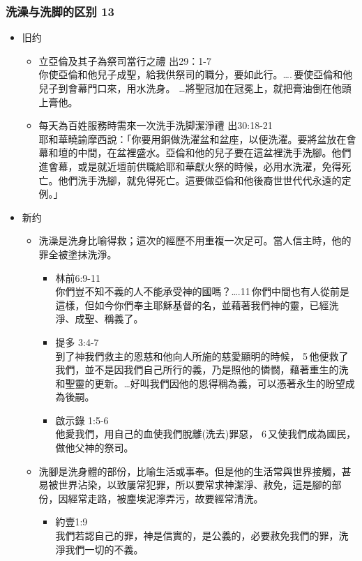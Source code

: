 \subsubsection{洗澡与洗脚的区别 13}
\begin{itemize}
\item 旧约

\begin{itemize}
\item 立亞倫及其子為祭司當行之禮 出29：1-7 \\
你使亞倫和他兒子成聖，給我供祭司的職分，要如此行。…. 要使亞倫和他兒子到會幕門口來，用水洗身。 …將聖冠加在冠冕上，就把膏油倒在他頭上膏他。
\item 每天為百姓服務時需來一次洗手洗脚潔淨禮 出30:18-21\\
耶和華曉諭摩西說：「你要用銅做洗濯盆和盆座，以便洗濯。要將盆放在會幕和壇的中間，在盆裡盛水。亞倫和他的兒子要在這盆裡洗手洗腳。他們進會幕，或是就近壇前供職給耶和華獻火祭的時候，必用水洗濯，免得死亡。他們洗手洗腳，就免得死亡。這要做亞倫和他後裔世世代代永遠的定例。」
\end{itemize}

\item 新约
\begin{itemize}
\item 洗澡是洗身比喻得救；這次的經歷不用重複一次足可。當人信主時，他的罪全被塗抹洗淨。
\begin{itemize}
\item 林前6:9-11\\
你們豈不知不義的人不能承受神的國嗎？….11 你們中間也有人從前是這樣，但如今你們奉主耶穌基督的名，並藉著我們神的靈，已經洗淨、成聖、稱義了。
\item 提多 3:4-7\\
到了神我們救主的恩慈和他向人所施的慈愛顯明的時候， 5 他便救了我們，並不是因我們自己所行的義，乃是照他的憐憫，藉著重生的洗和聖靈的更新。…好叫我們因他的恩得稱為義，可以憑著永生的盼望成為後嗣。
\item 啟示錄 1:5-6\\
他愛我們，用自己的血使我們脫離(洗去)罪惡， 6 又使我們成為國民，做他父神的祭司。
\end{itemize}

\item 洗腳是洗身體的部份，比喻生活或事奉。但是他的生活常與世界接觸，甚易被世界沾染，以致屢常犯罪，所以要常求神潔淨、赦免，這是腳的部份，因經常走路，被塵埃泥濘弄污，故要經常清洗。
\begin{itemize}
\item 約壹1:9\\
我們若認自己的罪，神是信實的，是公義的，必要赦免我們的罪，洗淨我們一切的不義。
\end{itemize}
\end{itemize}
\end{itemize}


